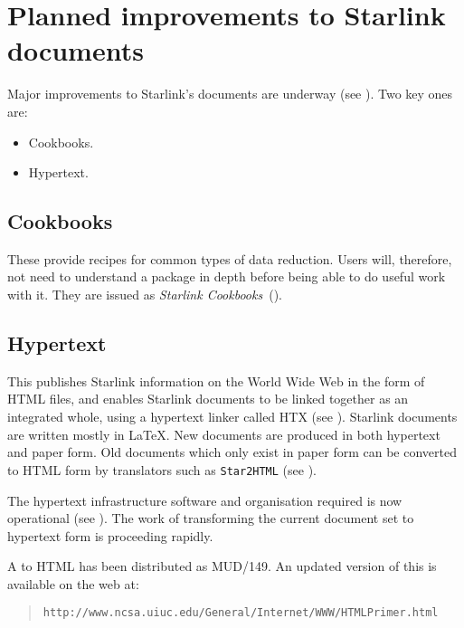 \documentclass[twoside,11pt,nolof]{starlink}
\begin{document}
\section{Planned improvements to Starlink documents}

Major improvements to Starlink's documents are underway
(see ).
Two key ones are:

\begin{itemize}
\item Cookbooks.
\item Hypertext.
\end{itemize}

\subsection{Cookbooks}

These provide recipes for common types of data reduction.
Users will, therefore, not need to understand a package in depth before being
able to do useful work with it.
They are issued as \emph{Starlink Cookbooks}\,
().

\subsection{Hypertext}

This publishes Starlink information on the World Wide Web in the
form of HTML files, and enables Starlink documents to be linked together
as an integrated whole, using a hypertext linker called HTX
(see ).
Starlink documents are written mostly in \LaTeX.
New documents are produced in both hypertext and paper form.
Old documents which only exist in paper form can be converted to HTML form by
translators such as \texttt{Star2HTML}
(see ).

The hypertext infrastructure software and organisation required is now
operational
(see ).
The work of transforming the current document set to hypertext form is
proceeding rapidly.

A 
to HTML has been distributed as MUD/149.
An updated version of this is available on the web at:
\begin{quote}
\texttt{http://www.ncsa.uiuc.edu/General/Internet/WWW/HTMLPrimer.html}
\end{quote}
\end{document}
